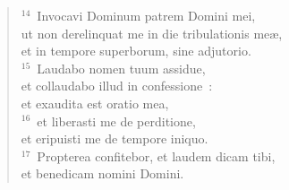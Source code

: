\begin{flushleft}
\begin{verse}
${}^{14}$~Invocavi Dominum patrem Domini mei,\\ ut non derelinquat me in die tribulationis me\ae ,\\ et in tempore superborum, sine adjutorio.\\
${}^{15}$~Laudabo nomen tuum assidue,\\ et collaudabo illud in confessione~:\\ et exaudita est oratio mea,\\
${}^{16}$~et liberasti me de perditione,\\ et eripuisti me de tempore iniquo.\\
${}^{17}$~Propterea confitebor, et laudem dicam tibi,\\ et benedicam nomini Domini.\end{verse}\end{flushleft}


